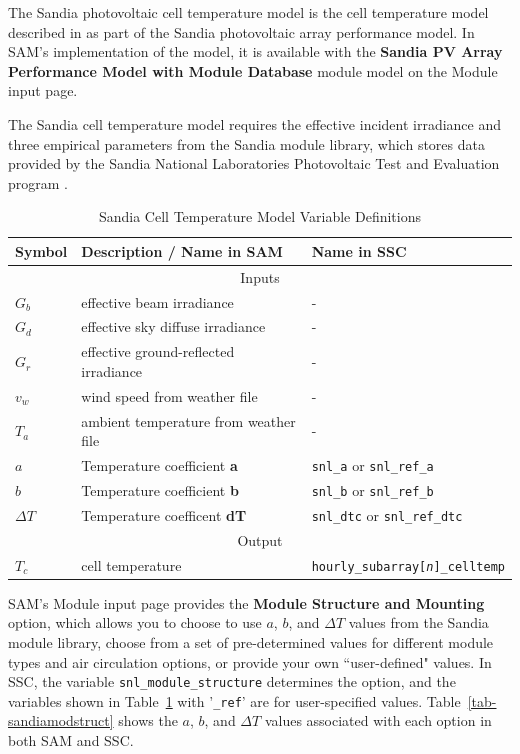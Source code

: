 \documentclass[12pt,letterpaper]{article}
\begin{document}
The Sandia photovoltaic cell temperature model is the cell temperature model described in \citet{king2004} as part of the Sandia photovoltaic array performance model. In SAM's implementation of the model, it is available with the \textbf{Sandia PV Array Performance Model with Module Database} module model on the Module input page.

The Sandia cell temperature model requires the effective incident irradiance and three empirical parameters from the Sandia module library, which stores data provided by the Sandia National Laboratories Photovoltaic Test and Evaluation program \citep{sandia-testeval}.

\begin{table}
\begin{center}
\caption{Sandia Cell Temperature Model Variable Definitions}
\begin{tabular}{lll}
\midrule
Symbol & Description / \textbf{Name in SAM} & Name in SSC \\
\midrule
\multicolumn{3}{c}{Inputs}\\
$G_b$ & effective beam irradiance & - \\
$G_d$ & effective sky diffuse irradiance & - \\
$G_r$ & effective ground-reflected irradiance & - \\
$v_{w}$ & wind speed from weather file & - \\
$T_{a}$ & ambient temperature from weather file & - \\
$a$ & Temperature coefficient \textbf{a} & \texttt{snl\_a} or \texttt{snl\_ref\_a}\\
$b$ &  Temperature coefficient \textbf{b} & \texttt{snl\_b} or \texttt{snl\_ref\_b}\\
$\Delta T$ & Temperature coefficent \textbf{dT} & \texttt{snl\_dtc} or \texttt{snl\_ref\_dtc} \\
\midrule
\multicolumn{3}{c}{Output}\\
$T_c$ & cell temperature & \texttt{hourly\_subarray[\textit{n}]\_celltemp} \\
\hline
\end{tabular}
\label{tab-tempsandia}
\end{center}
\end{table}

SAM's Module input page provides the \textbf{Module Structure and Mounting} option, which allows you to choose to use $a$, $b$, and $\Delta T$ values from the Sandia module library, choose from a set of pre-determined values for different module types and air circulation options, or provide your own ``user-defined" values. In SSC, the variable \texttt{snl\_module\_structure} determines the option, and the variables shown in Table~\ref{tab-tempsandia} with '\texttt{\_ref}' are for user-specified values. Table~\ref{tab-sandiamodstruct} shows the $a$, $b$, and $\Delta T$ values associated with each option in both SAM and SSC.
\end{document}
